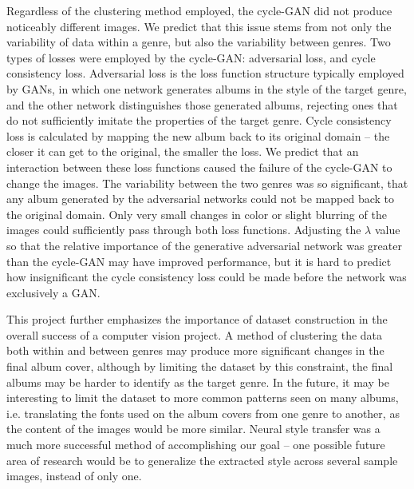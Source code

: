 \documentclass{article}
\begin{document}
Regardless of the clustering method employed, the cycle-GAN did not produce noticeably different images. We predict that this issue stems from not only the variability of data within a genre, but also the variability between genres. Two types of losses were employed by the cycle-GAN: adversarial loss, and cycle consistency loss. Adversarial loss is the loss function structure typically employed by GANs, in which one network generates albums in the style of the target genre, and the other network distinguishes those generated albums, rejecting ones that do not sufficiently imitate the properties of the target genre. Cycle consistency loss is calculated by mapping the new album back to its original domain – the closer it can get to the original, the smaller the loss. We predict that an interaction between these loss functions caused the failure of the cycle-GAN to change the images. The variability between the two genres was so significant, that any album generated by the adversarial networks could not be mapped back to the original domain. Only very small changes in color or slight blurring of the images could sufficiently pass through both loss functions. Adjusting the $\lambda$ value so that the relative importance of the generative adversarial network was greater than the cycle-GAN may have improved performance, but it is hard to predict how insignificant the cycle consistency loss could be made before the network was exclusively a GAN.

\par This project further emphasizes the importance of dataset construction in the overall success of a computer vision project. A method of clustering the data both within and between genres may produce more significant changes in the final album cover, although by limiting the dataset by this constraint, the final albums may be harder to identify as the target genre. In the future, it may be interesting to limit the dataset to more common patterns seen on many albums, i.e. translating the fonts used on the album covers from one genre to another, as the content of the images would be more similar. Neural style transfer was a much more successful method of accomplishing our goal – one possible future area of research would be to generalize the extracted style across several sample images, instead of only one.






\newpage

\appendix
\end{document}
